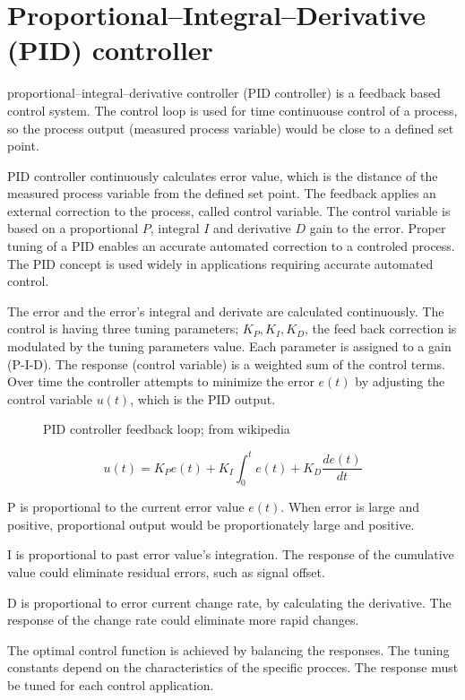 \documentclass[\main/master.tex]{subfiles}
\begin{document}
\section{Proportional–Integral–Derivative (PID) controller}
proportional–integral–derivative controller (PID controller) is a feedback based control system. The control loop is used for time continuouse control of a process, so the process output (measured process variable) would be close to a defined set point.
\par
PID controller continuously calculates error value, which is the distance of the measured process variable from the defined set point. The feedback applies an external correction to the process, called control variable. The control variable is based on a proportional $P$, integral $I$ and derivative $D$ gain to the error. Proper tuning of a PID enables an accurate automated correction to a controled process. The PID concept is used widely in applications requiring accurate automated control.

\par
The error and the error's integral and derivate are calculated continuously. The control is having three tuning parameters; $K_P, K_I, K_D$, the feed back correction is modulated by the tuning parameters value. Each parameter is assigned to a gain (P-I-D). The response (control variable) is a weighted sum of the control terms. Over time the controller attempts to minimize the error $e(t)$ by adjusting the control variable $u(t)$, which is the PID output.
\par
\begin{figure}[htbp]
	\centering
	\caption[PID]{PID controller feedback loop; from wikipedia}
	\label{fig:PID_scheme}
\end{figure}
\begin{equation}
u(t) = K_Pe(t)+K_I\int_{0}^{t}e(t)+K_D\frac{de(t)}{dt}   \label{eqn:PID_eq}
\end{equation}


P is proportional to the current error value $e(t)$. When error is large and positive, proportional output would be proportionately large and positive.
\par
I is proportional to past error value's integration. The response of the cumulative value could eliminate residual errors, such as signal offset.
\par
D is proportional to error current change rate, by calculating the derivative. The response of the change rate could eliminate more rapid changes.
\par
The optimal control function is achieved by balancing the responses. The tuning constants depend on the characteristics of the specific procces. The response must be tuned for each control application.  
\end{document}
